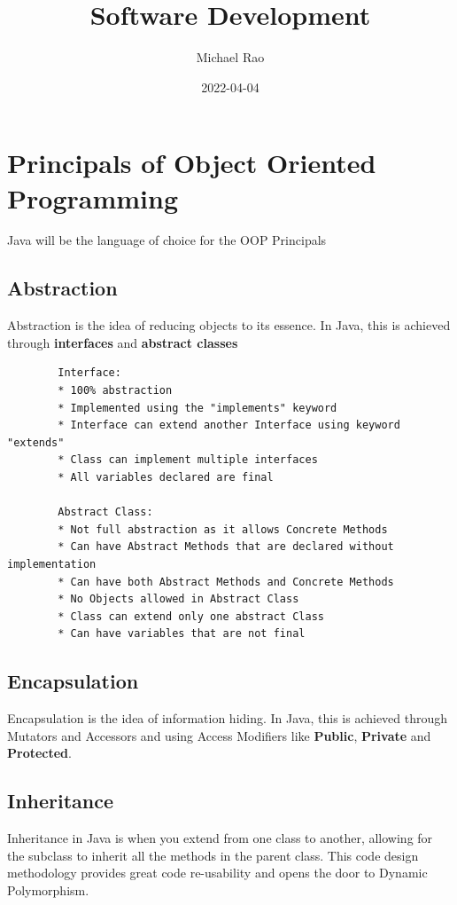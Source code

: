 \documentclass{article}
\title{Software Development}
\author{Michael Rao}
\date{2022-04-04}
\begin{document}
\maketitle

\tableofcontents

\newpage

\section{Principals of Object Oriented Programming}

	Java will be the language of choice for the OOP Principals

	\subsection{Abstraction}

		Abstraction is the idea of reducing objects to its essence. In Java, this is achieved through \textbf{interfaces} and \textbf{abstract classes}
	\begin{verbatim}
		Interface:
		* 100% abstraction
		* Implemented using the "implements" keyword
		* Interface can extend another Interface using keyword "extends"
		* Class can implement multiple interfaces
		* All variables declared are final

		Abstract Class:
		* Not full abstraction as it allows Concrete Methods
		* Can have Abstract Methods that are declared without implementation
		* Can have both Abstract Methods and Concrete Methods
		* No Objects allowed in Abstract Class
		* Class can extend only one abstract Class
		* Can have variables that are not final
	\end{verbatim}
	\subsection{Encapsulation}

		Encapsulation is the idea of information hiding. In Java, this is achieved through Mutators and Accessors and using Access Modifiers like \textbf{Public}, \textbf{Private} and \textbf{Protected}. 
	
	\subsection{Inheritance}
	
		Inheritance in Java is when you extend from one class to another, allowing for the subclass to inherit all the methods in the parent class. This code design methodology provides great code re-usability and opens the door to Dynamic Polymorphism. 
	
\end{document}
